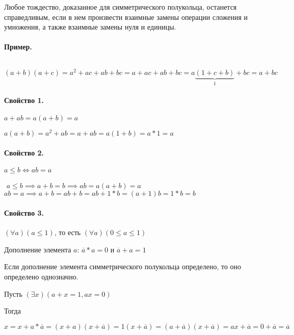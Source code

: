 Любое тождество, доказанное для симметрического полукольца, останется справедливым, если
в нем произвести взаимные замены операции сложения и умножения, а также взаимные замены
нуля и единицы.

\medskip

\paragraph*{Пример.} ${}$ \newline

$(a + b)(a + c) = a^2 + ac + ab + bc = a + ac + ab + bc = a \underbrace{(1 + c + b)}_{1}
+ bc = a + bc$ 

\paragraph*{Свойство 1.} $a + ab = a(a + b) = a$
\begin{myproof}
$a(a+b) = a^2 + ab = a + ab = a(1+b) = a*1 = a$
\end{myproof}

\paragraph*{Свойство 2.} $a \le b \Longleftrightarrow ab = a$
\begin{myproof} ${}$\newline 
$a \le b \implies a + b = b \implies ab = a(a + b) = a$
\newline
$ab = a \implies a + b = ab + b = ab + 1*b = (a+1)b = 1*b = b$
\end{myproof}

\paragraph*{Свойство 3.} $(\forall a)(a \le 1)$, то есть $(\forall a)(0 \le a \le 1)$


\begin{definition}
Дополнение элемента $a$: $\overline{a} * a = 0$ и $\overline{a} + a = 1$
\end{definition}

\begin{theorem}
Если дополнение элемента симметрического полукольца определено, то оно определено
однозначно.
\end{theorem}
\begin{myproof}
Пусть $(\exists x)(a + x = 1, ax = 0)$

Тогда

$$
x = x + a*\overline{a} = (x + a)(x + \overline{a}) = 1(x + \overline{a}) = 
(a + \overline{a})(x + \overline{a}) = ax + \overline{a} = 0 + \overline{a} = \overline{a}
$$
\end{myproof}

